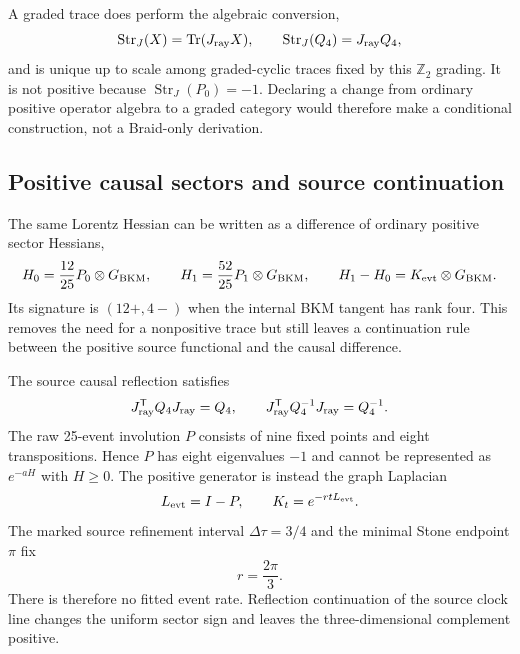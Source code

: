 \documentclass[11pt]{article}
\theoremstyle{definition}
\theoremstyle{remark}
\newcommand{\Tr}{\operatorname{Tr}}
\begin{document}
A graded trace does perform the algebraic conversion,
\begin{equation}
 \operatorname{Str}_{J}(X)=\Tr(J_{\rm ray}X),
 \qquad \operatorname{Str}_{J}(Q_4)=J_{\rm ray}Q_4,
\end{equation}
and is unique up to scale among graded-cyclic traces fixed by this $\mathbb Z_2$ grading. It is not positive because $\operatorname{Str}_{J}(P_0)=-1$. Declaring a change from ordinary positive operator algebra to a graded category would therefore make a conditional construction, not a Braid-only derivation.

\subsection{Positive causal sectors and source continuation}

The same Lorentz Hessian can be written as a difference of ordinary positive sector Hessians,
\begin{equation}
 H_0=\frac{12}{25}P_0\otimes G_{\rm BKM},
 \qquad
 H_1=\frac{52}{25}P_1\otimes G_{\rm BKM},
 \qquad H_1-H_0=K_{\rm evt}\otimes G_{\rm BKM}.
\end{equation}
Its signature is $(12+,4-)$ when the internal BKM tangent has rank four. This removes the need for a nonpositive trace but still leaves a continuation rule between the positive source functional and the causal difference.

The source causal reflection satisfies
\begin{equation}
 J_{\rm ray}^{\mathsf T}Q_4J_{\rm ray}=Q_4,
 \qquad
 J_{\rm ray}^{\mathsf T}Q_4^{-1}J_{\rm ray}=Q_4^{-1}.
\end{equation}
The raw 25-event involution $P$ consists of nine fixed points and eight transpositions. Hence $P$ has eight eigenvalues $-1$ and cannot be represented as $e^{-aH}$ with $H\ge0$. The positive generator is instead the graph Laplacian
\begin{equation}
 L_{\rm evt}=I-P,
 \qquad K_t=e^{-rtL_{\rm evt}}.
\end{equation}
The marked source refinement interval $\Delta\tau=3/4$ and the minimal Stone endpoint $\pi$ fix
\begin{equation}\label{eq:eventrate}
 r=\frac{2\pi}{3}.
\end{equation}
There is therefore no fitted event rate. Reflection continuation of the source clock line changes the uniform sector sign and leaves the three-dimensional complement positive.
\end{document}
